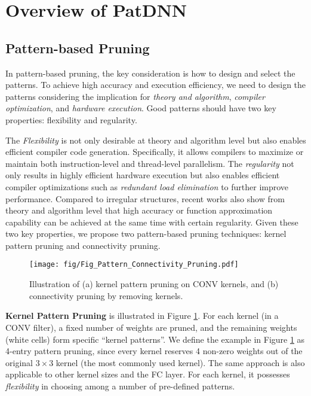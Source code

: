 \documentclass[sigplan,screen]{acmart}
\begin{document}
 \section{Overview of PatDNN}

\subsection{Pattern-based Pruning}

In pattern-based pruning, the key consideration
is how to design and select the patterns. 
To achieve high accuracy and execution efficiency,
we need to design the patterns considering the 
implication for {\em theory and algorithm},
{\em compiler optimization}, and 
{\em hardware execution}.
Good patterns should have two key properties:
flexibility and regularity.

The {\em Flexibility} is not only desirable at theory and algorithm level but also enables efficient
compiler code generation. 
Specifically, it allows compilers to 
maximize or maintain
both instruction-level and thread-level parallelism.
The {\em regularity} not only results in 
highly efficient hardware execution but also 
enables efficient compiler optimizations such as 
{\em redundant load elimination} to 
further improve performance. 
Compared to irregular structures, 
recent works also show from theory and algorithm
level that high accuracy or function approximation
capability can be achieved at the same time 
with certain regularity.
Given these two key properties, 
we propose two pattern-based pruning techniques:
kernel pattern pruning and connectivity pruning. 














\begin{figure}\centering
    \texttt{[image: fig/Fig\_Pattern\_Connectivity\_Pruning.pdf]}
\caption{Illustration of (a) kernel pattern pruning on CONV kernels, and (b) connectivity pruning by removing kernels.}
    \label{fig:pattern_connectivity}
\end{figure}


\textbf{Kernel Pattern Pruning} is illustrated in {Figure \ref{fig:pattern_connectivity}}. For each kernel (in a CONV filter), a fixed number of weights are pruned, and the remaining weights (white cells) form specific ``kernel patterns''. We define the example in {Figure \ref{fig:pattern_connectivity}} as 4-entry pattern pruning, since every kernel reserves 4 non-zero weights out of the original $3\times 3$ kernel (the most commonly used kernel). 
The same approach is also applicable to other kernel sizes and the FC layer. For each kernel, it possesses \emph{flexibility} in choosing among a number of pre-defined patterns. 
\end{document}
